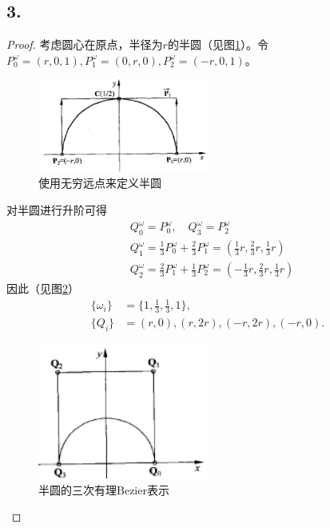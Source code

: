 \documentclass[utf8]{ctexart}
\begin{document}
\subsection*{3.}
\begin{proof}
    考虑圆心在原点，半径为$r$的半圆（见图\ref{fig: half_circ}）。令$P_0^{\omega}=(r,0,1),P_1^{\omega}=(0,r,0),P_2^{\omega}=(-r,0,1)$。

    \begin{figure}[H]
        \centering
        \includegraphics[width=0.5\textwidth]{half_circ.png}
        \caption{使用无穷远点来定义半圆}
        \label{fig: half_circ}
    \end{figure}
    对半圆进行升阶可得
    $$
    \begin{aligned}
        &Q_0^{\omega} = P_0^{\omega},\quad Q_3^{\omega} = P_2^{\omega}\\
        &Q_1^{\omega} = \frac{1}{3}P_0^{\omega} + \frac{2}{3}P_1^{\omega} = (\frac{1}{3}r, \frac{2}{3}r,\frac{1}{3}r)\\
        &Q_2^{\omega} = \frac{2}{3}P_1^{\omega} + \frac{1}{3}P_2^{\omega} = (-\frac{1}{3}r, \frac{2}{3}r,\frac{1}{3}r)
    \end{aligned}
    $$
    因此（见图\ref{fig: half_circ2}）
    $$
    \begin{aligned}
        \{\omega_i\} &= \{1,\frac{1}{3},\frac{1}{3},1\},\\
        \{Q_i\} &= {(r,0),(r,2r),(-r,2r),(-r,0)}.
    \end{aligned}
    $$
    \begin{figure}[H]
        \centering
        \includegraphics[width=0.5\textwidth]{half_circ2.png}
        \caption{半圆的三次有理Bezier表示}
        \label{fig: half_circ2}
    \end{figure}

\end{proof}
\end{document}

